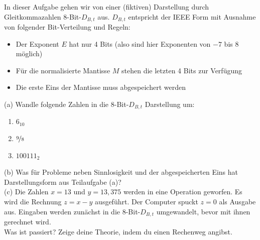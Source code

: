 \documentclass{scrartcl}
\begin{document}
	In dieser Aufgabe gehen wir von einer (fiktiven) Darstellung durch Gleitkommazahlen 8-Bit-$D_{B,t}$ aus. $D_{B,t}$ entspricht der IEEE Form mit Ausnahme von folgender Bit-Verteilung und Regeln:
	\begin{itemize}
		\item Der Exponent $E$ hat nur 4 Bits (also sind hier Exponenten von $-7$ bis $8$ möglich)
		\item Für die normalisierte Mantisse $M$ stehen die letzten 4 Bits zur Verfügung
		\item Die erste Eins der Mantisse muss abgespeichert werden
	\end{itemize}
	(a) 
	Wandle folgende Zahlen in die 8-Bit-$D_{B,t}$ Darstellung um:
	\begin{enumerate}
		\item $6_{10}$
		\item $\nicefrac{9}{8}$
		\item $100111_{2}$
	\end{enumerate}
	\lbreak \lbreak \lbreak
	(b) 
	Was für Probleme neben Sinnlosigkeit und der abgespeicherten Eins hat Darstellungsform aus Teilaufgabe (a)?
	\lbreak \lbreak \lbreak
	\\
	(c) 
	Die Zahlen $x = 13$ und $y = 13,375$ werden in eine Operation geworfen. Es wird die Rechnung $z = x - y$ ausgeführt. Der Computer spuckt $z = 0$ als Ausgabe aus. Eingaben werden zunächst in die 8-Bit-$D_{B,t}$ umgewandelt, bevor mit ihnen gerechnet wird. \sbreak \\
	Was ist passiert? Zeige deine Theorie, indem du einen Rechenweg angibst.
	

	
\end{document}
